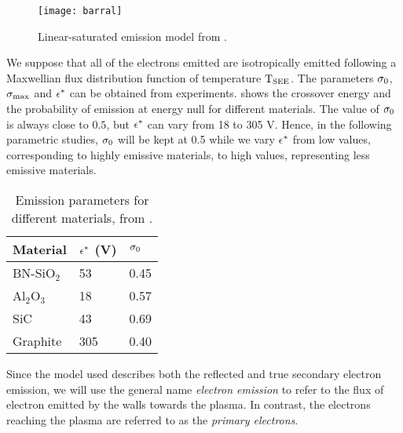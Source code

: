 \begin{figure}[hbt]
  \centering
  \texttt{[image: barral]}
  \caption{Linear-saturated emission model from \citet{barral2003a}.}
  \label{fig-modelbarral}
\end{figure}

 We suppose that all of the electrons emitted are isotropically emitted following a Maxwellian flux distribution function of temperature $\mathrm{T_{SEE}}$.
 The parameters $\sigma _0$,  $\sigma _{\rm max} $ and $\epsilon^{*}$ can be obtained from experiments. 
  shows the crossover energy and the  probability of emission at energy null for different materials.
 The value of $\sigma _0$ is always close to $0.5$, but $\epsilon^{*}$ can vary from 18 to 305 V.
 Hence, in the following parametric studies, $\sigma _0$ will be kept at 0.5 while we vary $\epsilon^{*}$ from low values, corresponding to highly emissive materials, to high values, representing less emissive materials.
 
 \begin{table}[hbt]
   \centering
   \caption{Emission parameters for different materials, from \citet{barral2003a}.}
   \label{tab-seeparames}
   \begin{tabular}{@{}lll@{}} \toprule
   Material & $\epsilon^{*}$ (V)& $\sigma _0$ \\ \midrule
   BN-SiO$_2$ & 53 & 0.45 \\ 
   Al$_2$O$_3$ & 18  & 0.57 \\ 
   SiC     &  43  &0.69  \\
   Graphite & 305  & 0.40 \\ 
   \bottomrule
   \end{tabular}
 \end{table}
 
 Since the model used describes both the reflected and true secondary electron emission, we will use the general name \emph{electron emission}  to refer to the flux of electron emitted by the walls towards the plasma.
 In contrast, the electrons reaching the plasma are referred to as the \emph{primary electrons}.
